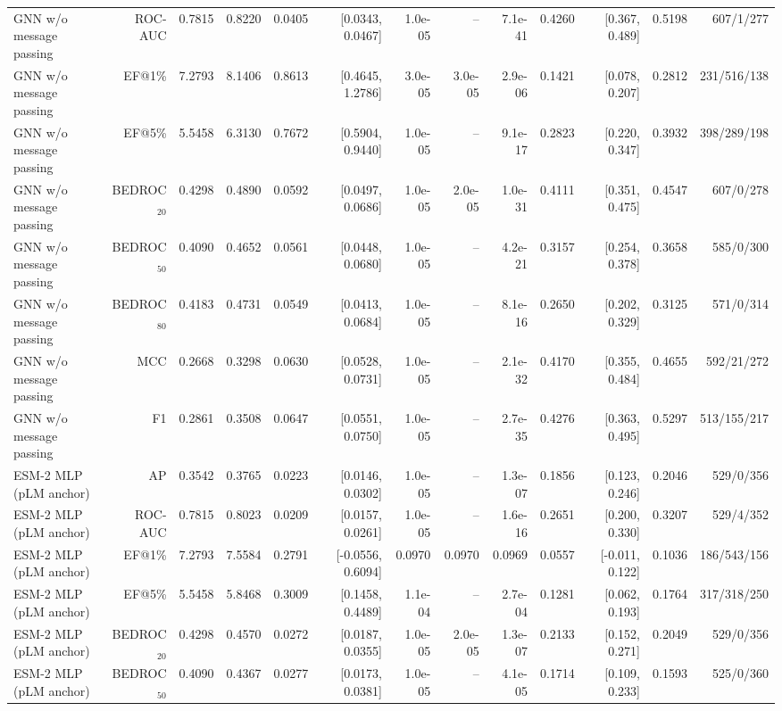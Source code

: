 \begin{table}[t]
\begin{tabular}{lrrrrrrrrrrrr}
GNN w/o message passing & ROC-AUC & 0.7815 & 0.8220 & 0.0405 & [0.0343, 0.0467] & 1.0e-05 & -- & 7.1e-41 & 0.4260 & [0.367, 0.489] & 0.5198 & 607/1/277 \\
GNN w/o message passing & EF@1\% & 7.2793 & 8.1406 & 0.8613 & [0.4645, 1.2786] & 3.0e-05 & 3.0e-05 & 2.9e-06 & 0.1421 & [0.078, 0.207] & 0.2812 & 231/516/138 \\
GNN w/o message passing & EF@5\% & 5.5458 & 6.3130 & 0.7672 & [0.5904, 0.9440] & 1.0e-05 & -- & 9.1e-17 & 0.2823 & [0.220, 0.347] & 0.3932 & 398/289/198 \\
GNN w/o message passing & BEDROC$_{20}$ & 0.4298 & 0.4890 & 0.0592 & [0.0497, 0.0686] & 1.0e-05 & 2.0e-05 & 1.0e-31 & 0.4111 & [0.351, 0.475] & 0.4547 & 607/0/278 \\
GNN w/o message passing & BEDROC$_{50}$ & 0.4090 & 0.4652 & 0.0561 & [0.0448, 0.0680] & 1.0e-05 & -- & 4.2e-21 & 0.3157 & [0.254, 0.378] & 0.3658 & 585/0/300 \\
GNN w/o message passing & BEDROC$_{80}$ & 0.4183 & 0.4731 & 0.0549 & [0.0413, 0.0684] & 1.0e-05 & -- & 8.1e-16 & 0.2650 & [0.202, 0.329] & 0.3125 & 571/0/314 \\
GNN w/o message passing & MCC & 0.2668 & 0.3298 & 0.0630 & [0.0528, 0.0731] & 1.0e-05 & -- & 2.1e-32 & 0.4170 & [0.355, 0.484] & 0.4655 & 592/21/272 \\
GNN w/o message passing & F1 & 0.2861 & 0.3508 & 0.0647 & [0.0551, 0.0750] & 1.0e-05 & -- & 2.7e-35 & 0.4276 & [0.363, 0.495] & 0.5297 & 513/155/217 \\
ESM-2 MLP (pLM anchor) & AP & 0.3542 & 0.3765 & 0.0223 & [0.0146, 0.0302] & 1.0e-05 & -- & 1.3e-07 & 0.1856 & [0.123, 0.246] & 0.2046 & 529/0/356 \\
ESM-2 MLP (pLM anchor) & ROC-AUC & 0.7815 & 0.8023 & 0.0209 & [0.0157, 0.0261] & 1.0e-05 & -- & 1.6e-16 & 0.2651 & [0.200, 0.330] & 0.3207 & 529/4/352 \\
ESM-2 MLP (pLM anchor) & EF@1\% & 7.2793 & 7.5584 & 0.2791 & [-0.0556, 0.6094] & 0.0970 & 0.0970 & 0.0969 & 0.0557 & [-0.011, 0.122] & 0.1036 & 186/543/156 \\
ESM-2 MLP (pLM anchor) & EF@5\% & 5.5458 & 5.8468 & 0.3009 & [0.1458, 0.4489] & 1.1e-04 & -- & 2.7e-04 & 0.1281 & [0.062, 0.193] & 0.1764 & 317/318/250 \\
ESM-2 MLP (pLM anchor) & BEDROC$_{20}$ & 0.4298 & 0.4570 & 0.0272 & [0.0187, 0.0355] & 1.0e-05 & 2.0e-05 & 1.3e-07 & 0.2133 & [0.152, 0.271] & 0.2049 & 529/0/356 \\
ESM-2 MLP (pLM anchor) & BEDROC$_{50}$ & 0.4090 & 0.4367 & 0.0277 & [0.0173, 0.0381] & 1.0e-05 & -- & 4.1e-05 & 0.1714 & [0.109, 0.233] & 0.1593 & 525/0/360 \\

\end{tabular}
\end{table}
